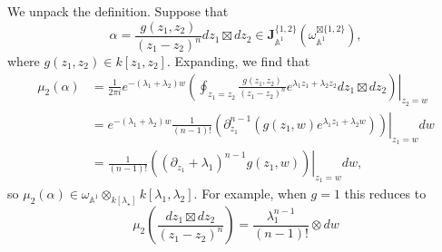 \documentclass[11pt]{amsart}
\theoremstyle{definition}
\theoremstyle{remark}
\numberwithin{equation}{section}
\begin{document}
  We unpack the definition.
  Suppose that
$$\alpha=\frac{g(z_{1},z_{2})}{(z_{1}-z_{2})^{n}}dz_{1}\boxtimes dz_{2}\in \mathbf{J}_{\mathbb{A}^1}^{\{1,2\}}
(\omega_{\mathbb{A}^1}^{\boxtimes\{1,2\}}),
$$
where $g(z_{1},z_{2})\in k[z_{1},z_{2}]$.
Expanding, we find that
\begin{align*}
 \mu_2(\alpha)
 &=\frac{1}{2\pi i}e^{-(\lambda_{1}+\lambda_{2})w}\left. \left(\oint_{z_{1}=z_2}\frac{g(z_{1},z_{2})}{(z_{1}-z_{2})^{n}}e^{\lambda_{1}z_{1}+\lambda_{2}z_{2}}dz_{1}\boxtimes dz_{2}\right)\right|_{z_{2}=w}\\
 &= e^{-(\lambda_{1}+\lambda_{2})w}\frac{1}{(n-1)!}\left.\left(\partial_{z_{1}}^{n-1}\left(g(z_{1},w)e^{\lambda_{1}z_{1}+\lambda_{2}w}\right)\right)\right|_{z_{1}=w}dw
 \\
 &=\frac{1}{(n-1)!}
\left.\left((\partial_{z_{1}}+\lambda_{1})^{n-1}g(z_{1},w)\right)\right|_{z_{1}=w}dw,
\end{align*}
so $\mu_2(\alpha)\in \omega_{\mathbb{A}^{1}}\otimes_{k[\lambda_{\star}]}k[\lambda_{1},\lambda_{2}].$
For example, when $g = 1$ this reduces to
\begin{equation}
  \mu_2\left(\frac{d z_{1} \boxtimes d z_{2}}{(z_{1}-z_{2})^{n}}\right) = \frac{\lambda_{1}^{n-1}}{(n-1)!} \otimes d w
\end{equation}
\end{document}
